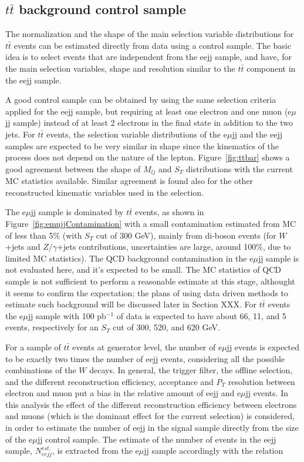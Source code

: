 \subsection{$t\bar{t}$ background control sample}

The normalization and the shape of the main selection variable distributions for 
$t\bar{t}$ events can be estimated directly from data using a control sample. 
The basic idea is to select events that are independent from the eejj sample, and have, for the main selection variables, 
shape and resolution similar to the $t\bar{t}$ component in the eejj sample.

A good control sample can be obtained by using the same selection criteria applied for the eejj sample, but 
requiring at least one electron and one muon (e$\mu$jj sample) instead of at least 2 electrons 
in the final state in addition to the two jets. 
For $t\bar{t}$ events, the selection variable distributions of the e$\mu$jj and the eejj samples
are expected to be very similar in shape since the kinematics of the process does not depend 
on the nature of the lepton. Figure~\ref{fig:ttbar} shows a good agreement between 
the shape of $M_{lj}$ and $S_{T}$ distributions with the current MC statistics available. Similar agreement 
is found also for the other reconstructed kinematic variables used in the selection. 

The e$\mu$jj sample is dominated by $t\bar{t}$ events, as shown in Figure~\ref{fig:emujjContamination} 
with a small contamination estimated from MC of less than 5\% (with $S_{T}$ cut of 300 GeV), 
mainly from di-boson events (for $W$+jets and $Z/\gamma$+jets contributions, uncertainties are large, 
around 100\%, due to limited MC statistics). 
The QCD background contamination in the e$\mu$jj sample is not evaluated here, and it's expected to be small. 
The MC statistics of QCD sample is not sufficient to perform a reasonable estimate at this stage, althought 
it seems to confirm the expectation; the plans of using data driven methods to estimate such background will be discussed later in Section XXX. 
For $t\bar{t}$ events the e$\mu$jj sample with 100 pb$^{-1}$ of data 
is expected to have about 66, 11, and 5 events, respectively for an $S_{T}$ cut of 300, 520, and 620 GeV.

For a sample of $t\bar{t}$ events at generator level, the number of e$\mu$jj events is expected to be exactly two times the number of 
eejj events, considering all the possible combinations of the $W$ decays. In general, the trigger filter, the offline selection, 
and the different reconstruction efficiency, acceptance and $P_{T}$ resolution between electron and muon
put a bias in the relative amount of eejj and e$\mu$jj events. 
In this analysis the effect of the different reconstruction efficiency between electrons and muons 
(which is the dominant effect for the current selection) 
is considered, in order to estimate the number of eejj in the signal sample directly from 
the size of the e$\mu$jj control sample. The estimate of the number of events in the eejj sample, 
$N_{eejj}^{est.}$, is extracted from the e$\mu$jj sample accordingly with the relation 

